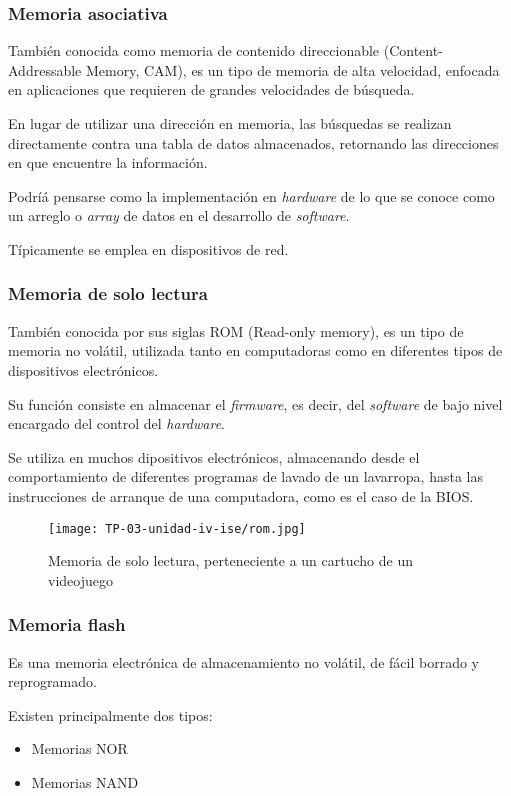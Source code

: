 \documentclass[12pt]{article}
\begin{document}
\subsubsection{Memoria asociativa}

También conocida como memoria de contenido direccionable
(Content-Addressable Memory, CAM),
es un tipo de memoria de alta velocidad,
enfocada en aplicaciones que requieren de grandes velocidades de búsqueda.

En lugar de utilizar una dirección en memoria, las búsquedas
se realizan directamente contra una tabla de datos almacenados,
retornando las direcciones en que encuentre la información.

Podríá pensarse como la implementación en \textit{hardware}
de lo que se conoce como un arreglo o \textit{array} de datos en el
desarrollo de \textit{software}.

Típicamente se emplea en dispositivos de red.

\subsubsection{Memoria de solo lectura}

También conocida por sus siglas ROM
(Read-only memory),
es un tipo de memoria no volátil,
utilizada tanto en computadoras como en diferentes tipos de dispositivos
electrónicos.

Su función consiste en almacenar el \textit{firmware},
es decir, del \textit{software} de bajo nivel encargado del control del
\textit{hardware}.

Se utiliza en muchos dipositivos electrónicos,
almacenando desde el comportamiento de diferentes programas de lavado de un
lavarropa, hasta las instrucciones de arranque de una computadora,
como es el caso de la BIOS.

\begin{figure}[ht]
  \centering
  \texttt{[image: TP-03-unidad-iv-ise/rom.jpg]}
  \caption{Memoria de solo lectura, perteneciente a un cartucho de un videojuego}
\end{figure}

\subsubsection{Memoria flash}

Es una memoria electrónica de almacenamiento no volátil,
de fácil borrado y reprogramado.

Existen principalmente dos tipos:
\begin{itemize}
  \item Memorias NOR
  \item Memorias NAND
\end{itemize}
\end{document}
